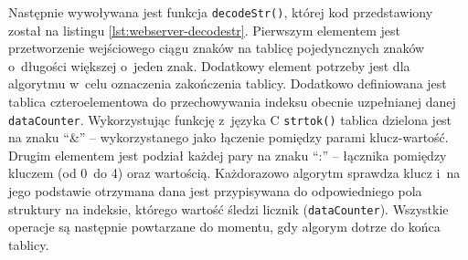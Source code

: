 

\FloatBarrier
Następnie wywoływana jest funkcja \texttt{decodeStr()}, której kod przedstawiony został na listingu
\ref{lst:webserver-decodestr}. Pierwszym elementem jest przetworzenie wejściowego ciągu znaków na tablicę pojedyncznych
znaków o~długości większej o~jeden znak. Dodatkowy element potrzeby jest dla algorytmu w~celu oznaczenia zakończenia
tablicy. Dodatkowo definiowana jest tablica czteroelementowa do przechowywania indeksu obecnie uzpełnianej danej
\texttt{dataCounter}. Wykorzystując funkcję z~języka C \texttt{strtok()} tablica dzielona jest na znaku \enquote{\&} --
wykorzystanego jako łączenie pomiędzy parami klucz-wartość. Drugim elementem jest podział każdej pary na znaku
\enquote{:} -- łącznika pomiędzy kluczem (od 0~do 4) oraz wartością. Każdorazowo algorytm sprawdza klucz i~na jego
podstawie otrzymana dana jest przypisywana do odpowiedniego pola struktury na indeksie, którego wartość śledzi licznik
(\texttt{dataCounter}). Wszystkie operacje są następnie powtarzane do momentu, gdy algorym dotrze do końca tablicy.

